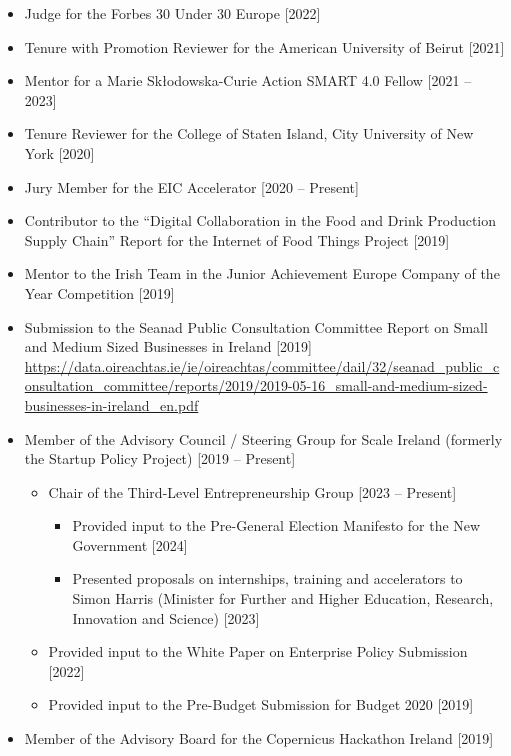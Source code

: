 \documentclass[10pt,a4paper]{res} %
\begin{document}
\begin{resume}
\begin{itemize}
\begin{itemize}
\item Coordinated the return visit of the Lorient mayoral delegation to the University of Galway in May 2022
\end{itemize}
\item Judge for the Forbes 30 Under 30 Europe [2022]
\item Tenure with Promotion Reviewer for the American University of Beirut [2021]
\item Mentor for a Marie Sk\l{}odowska-Curie Action SMART 4.0 Fellow [2021 -- 2023] 
\item Tenure Reviewer for the College of Staten Island, City University of New York [2020]
\item Jury Member for the EIC Accelerator [2020 -- Present]
\item Contributor to the ``Digital Collaboration in the Food and Drink Production Supply Chain'' Report for the Internet of Food Things Project [2019]
\item Mentor to the Irish Team in the Junior Achievement Europe Company of the Year Competition [2019]
\item Submission to the Seanad Public Consultation Committee Report on Small and Medium Sized Businesses in Ireland [2019] \url{https://data.oireachtas.ie/ie/oireachtas/committee/dail/32/seanad_public_consultation_committee/reports/2019/2019-05-16_small-and-medium-sized-businesses-in-ireland_en.pdf}
\item Member of the Advisory Council / Steering Group for Scale Ireland (formerly the Startup Policy Project) [2019 -- Present]
\begin{itemize} \itemsep -2pt
\item Chair of the Third-Level Entrepreneurship Group [2023 -- Present]
\begin{itemize} \itemsep -2pt
\item Provided input to the Pre-General Election Manifesto for the New Government [2024]
\item Presented proposals on internships, training and accelerators to Simon Harris (Minister for Further and Higher Education, Research, Innovation and Science) [2023]
\end{itemize}
\item Provided input to the White Paper on Enterprise Policy Submission [2022]
\item Provided input to the Pre-Budget Submission for Budget 2020 [2019]
\end{itemize}
\item Member of the Advisory Board for the Copernicus Hackathon Ireland [2019]

\end{itemize}
\end{resume}
\end{document}
